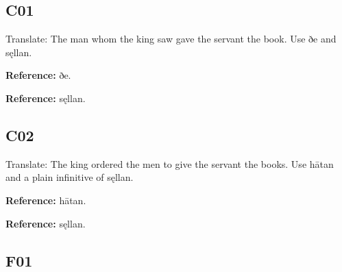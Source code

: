 


\subsection*{C01}

Translate: The man whom the king saw gave the servant the book. Use ðe and sęllan.

\textbf{Reference:} ðe.

\textbf{Reference:} sęllan.


\subsection*{C02}

Translate: The king ordered the men to give the servant the books. Use hātan and a plain infinitive of sęllan.

\textbf{Reference:} hātan.

\textbf{Reference:} sęllan.


\subsection*{F01}

